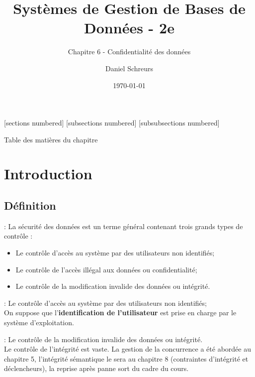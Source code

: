 \documentclass[10pt]{beamer}
\title{Systèmes de Gestion de Bases de Données - 2e}
\subtitle{Chapitre 6 - Confidentialité des données}
\date{\today}
\author{Daniel Schreurs}
\institute{Haute École de la Province de Liège}
\begin{document}
\maketitle

[sections numbered]
[subsections numbered]
[subsubsections numbered]
\begin{frame}[allowframebreaks]{Table des matières du chapitre}
    \tableofcontents[subsectionstyle=show/show/hide,subsubsectionstyle=show/show/hide,]
\end{frame}

\section{Introduction}
\tocss
\subsection{Définition}
\begin{frame}{\secname : \subsecname}
    La sécurité des données est un terme général contenant trois grands types de contrôle :
    \begin{itemize}
        \item Le contrôle d'accès au système par des utilisateurs non identifiés;
        \item Le contrôle de l'accès illégal aux données ou confidentialité;
        \item Le contrôle de la modification invalide des données ou intégrité.
    \end{itemize}
\end{frame}

\begin{frame}{\secname : \subsecname}
    Le contrôle d'accès au système par des utilisateurs non identifiés;\\
    On suppose que l'\textbf{identification de l'utilisateur} est prise en charge par le système d'exploitation.
\end{frame}

\begin{frame}{\secname : \subsecname}
    Le contrôle de la modification invalide des données ou intégrité.\\
    Le contrôle de l'intégrité est vaste. La gestion de la concurrence a été abordée au chapitre 5, l'intégrité sémantique le sera au chapitre 8 (contraintes d'intégrité et déclencheurs), la reprise après panne sort du cadre du cours.
\end{frame}
\end{document}
